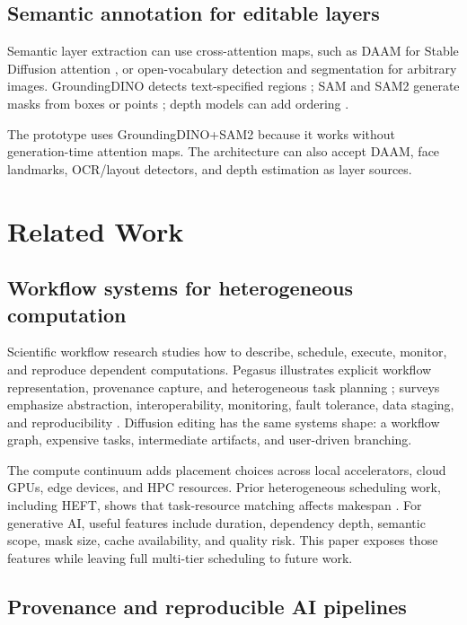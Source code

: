 \documentclass[final,5p,times,number,sort&compress]{elsarticle}
\begin{document}
\subsection{Semantic annotation for editable layers}

Semantic layer extraction can use cross-attention maps, such as DAAM for Stable Diffusion attention \citep{tang2023daam}, or open-vocabulary detection and segmentation for arbitrary images. GroundingDINO detects text-specified regions \citep{liu2023groundingdino,hfGroundingDinoTiny}; SAM and SAM2 generate masks from boxes or points \citep{kirillov2023sam,ravi2024sam2,hfSam21HieraTiny}; depth models can add ordering \citep{yang2024depthanything}.

The prototype uses GroundingDINO+SAM2 because it works without generation-time attention maps. The architecture can also accept DAAM, face landmarks, OCR/layout detectors, and depth estimation as layer sources.

\section{Related Work}

\subsection{Workflow systems for heterogeneous computation}

Scientific workflow research studies how to describe, schedule, execute, monitor, and reproduce dependent computations. Pegasus illustrates explicit workflow representation, provenance capture, and heterogeneous task planning \citep{deelman2015pegasus}; surveys emphasize abstraction, interoperability, monitoring, fault tolerance, data staging, and reproducibility \citep{deelman2009workflows,liew2017scientific}. Diffusion editing has the same systems shape: a workflow graph, expensive tasks, intermediate artifacts, and user-driven branching.

The compute continuum adds placement choices across local accelerators, cloud GPUs, edge devices, and HPC resources. Prior heterogeneous scheduling work, including HEFT, shows that task-resource matching affects makespan \citep{topcuoglu2002heft}. For generative AI, useful features include duration, dependency depth, semantic scope, mask size, cache availability, and quality risk. This paper exposes those features while leaving full multi-tier scheduling to future work.

\subsection{Provenance and reproducible AI pipelines}
\end{document}
